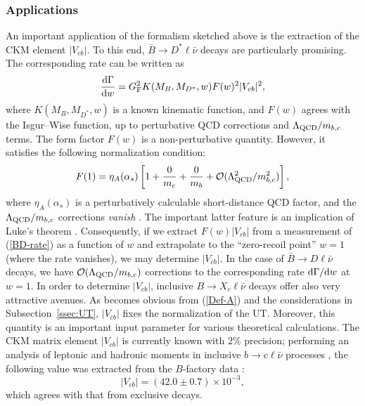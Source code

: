 \documentclass[11pt]{cernrep}
\begin{document}
%
%
%
\subsubsection{Applications}
%
%
%
An important application of the formalism sketched above is the
extraction of the CKM element $|V_{cb}|$. To this end, 
$\bar B\to D^*\ell\bar \nu$ decays are particularly promising. 
The corresponding rate can be written as 
\begin{equation}\label{BD-rate}
\frac{{\rm d}\Gamma}{{\rm d}w}=G_{\rm F}^2 K(M_B,M_{D^\ast},w) 
F(w)^2 |V_{cb}|^2,
\end{equation}
where $K(M_B,M_{D^\ast},w)$ is a known kinematic function, and 
$F(w)$ agrees with the Isgur--Wise function, up to perturbative
QCD corrections and $\Lambda_{\rm QCD}/m_{b,c}$ terms. The form 
factor $F(w)$ is a non-perturbative quantity. However, it satisfies 
the following normalization condition:
\begin{equation}\label{F1-norm}
F(1)=\eta_A(\alpha_s)\left[1+\frac{0}{m_c}+
\frac{0}{m_b}+
{\cal O}(\Lambda_{\rm QCD}^2/m_{b,c}^2)\right],
\end{equation} 
where $\eta_A(\alpha_s)$ is a perturbatively calculable short-distance
QCD factor, and the $\Lambda_{\rm QCD}/m_{b,c}$ corrections {\it vanish}
\cite{neubert-rev,neu-BDast}. The important latter feature is an 
implication of Luke's theorem \cite{luke}. Consequently, 
if we extract $F(w)|V_{cb}|$ from a measurement of (\ref{BD-rate}) 
as a function of $w$ and extrapolate to the ``zero-recoil point'' $w=1$
(where the rate vanishes), we may determine $|V_{cb}|$. In the case of 
$\bar B\to D\ell\bar \nu$ decays, we have 
${\cal O}(\Lambda_{\rm QCD}/m_{b,c})$ corrections to the 
corresponding rate ${\rm d}\Gamma/{\rm d}w$ at $w=1$. 
In order to determine $|V_{cb}|$, inclusive $B\to X_c\ell\bar \nu$ decays 
offer also very attractive avenues. As becomes obvious from (\ref{Def-A})
and the considerations in Subsection~\ref{ssec:UT}, $|V_{cb}|$ fixes 
the normalization of the UT. Moreover, this quantity is an important 
input parameter for various theoretical calculations. The CKM matrix
element $|V_{cb}|$ is currently known with $2\%$ precision;  performing an analysis
of leptonic and hadronic moments in inclusive $b\to c \ell \bar \nu$ processes 
\cite{Gambino}, the following value was extracted from the $B$-factory 
data \cite{OBuchmuller}:
\begin{equation}\label{Vcb}
|V_{cb}| = (42.0\pm 0.7)\times 10^{-3},
\end{equation}
which agrees with that from exclusive decays. 
\end{document}
